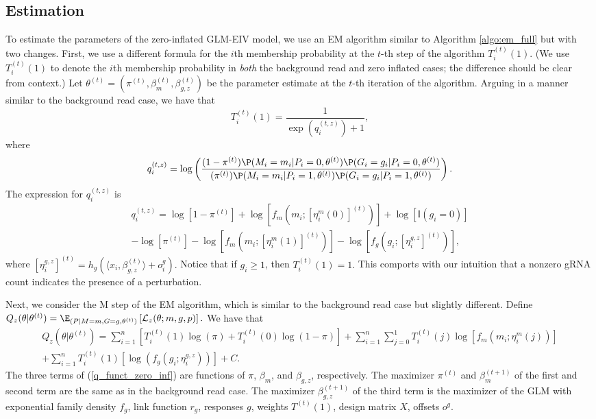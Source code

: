 \documentclass[11pt]{article}
\begin{document}
\begin{appendices}
\begin{refsection}
\subsection{Estimation}
To estimate the parameters of the zero-inflated GLM-EIV model, we use an EM algorithm similar to Algorithm \ref{algo:em_full} but with two changes. First, we use a different formula for the $i$th membership probability at the $t$-th step of the algorithm $T^{(t)}_i(1)$. (We use $T^{(t)}_i(1)$ to denote the $i$th membership probability in \textit{both} the background read and zero inflated cases; the difference should be clear from context.) Let $\theta^{(t)} = (\pi^{(t)}, \beta^{(t)}_m, \beta^{(t)}_{g,z})$ be the parameter estimate at the $t$-th iteration of the algorithm. Arguing in a manner similar to the background read case, we have that $$T^{(t)}_i(1) = \frac{1}{ \exp(q_i^{\left(t,z\right)}) + 1},$$ where
$$q_i^{(t,z)} = \log \left(\frac{(1 - \pi^{(t)}) \P(M_i = m_i | P_i = 0, \theta^{(t)}) \P(G_i = g_i | P_i = 0, \theta^{(t)})}{(\pi^{(t)}) \P(M_i = m_i | P_i = 1, \theta^{(t)}) \P(G_i = g_i | P_i = 1, \theta^{(t)})}\right).$$
The expression for $q^{(t,z)}_i$ is
\begin{multline*}
q^{(t,z)}_i = \log\left[ 1 - \pi^{(t)} \right] + \log\left[ f_m\left(m_i; \left[ \eta^m_i(0) \right]^{(t)}\right) \right] + \log\left[ \mathbb{I}(g_i = 0) \right] \\ - \log\left[ \pi^{(t)} \right] - \log\left[ f_m\left(m_i; \left[ \eta^m_i(1) \right]^{(t)}\right) \right] - \log\left[ f_g\left(g_i; \left[\eta^{g,z}_i \right]^{(t)}\right) \right],
\end{multline*}
where $[\eta^{g,z}_i]^{(t)} = h_g( \langle x_i, \beta^{(t)}_{g,z} \rangle + o^g_i).$ Notice that if $g_i \geq 1$, then $T^{(t)}_i(1) = 1.$ This comports with our intuition that a nonzero gRNA count indicates the presence of a perturbation.

Next, we consider the M step of the EM algorithm, which is similar to the background read case but slightly different. Define $Q_z(\theta | \theta^{(t)}) = \E_{(P | M = m, G = g, \theta^{(t)})} \left[ \mathcal{L}_z(\theta; m, g, p) \right].$ We have that
\begin{multline}\label{q_funct_zero_inf}
Q_z(\theta | \theta^{(t)}) = \sum_{i=1}^n \left[ T^{(t)}_i(1)\log(\pi) + T_i^{(t)}(0) \log(1 - \pi)\right] + \sum_{i=1}^n \sum_{j=0}^1 T^{(t)}_i(j) \log \left[ f_m( m_i; \eta_i^m(j)) \right] \\ + \sum_{i=1}^n T_i^{(t)}(1) \left[ \log( f_g(g_i; \eta_i^{g, z}))\right] + C.
\end{multline}
The three terms of (\ref{q_funct_zero_inf}) are functions of $\pi$, $\beta_m$, and $\beta_{g,z}$, respectively. The maximizer $\pi^{(t)}$ and $\beta_m^{(t+1)}$ of the first and second term are the same as in the background read case. The maximizer $\beta^{(t+1)}_{g,z}$ of the third term is the maximizer of the GLM with exponential family density $f_g$, link function $r_g$, responses $g$, weights $T^{(t)}(1)$, design matrix $X$, offsets $o^g$.


\end{refsection}
\end{appendices}
\end{document}
